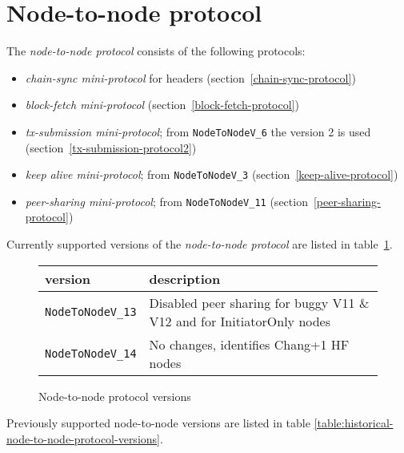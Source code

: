 \section{Node-to-node protocol}
\label{section:node-to-node-protocol}
\newline
{}\newline

The \textit{node-to-node protocol} consists of the following protocols:
\begin{itemize}
  \item \textit{chain-sync mini-protocol} for headers (section~\ref{chain-sync-protocol})
  \item \textit{block-fetch mini-protocol} (section~\ref{block-fetch-protocol})
  \item \textit{tx-submission mini-protocol};  from \texttt{NodeToNodeV\_6} the version
    2 is used  (section~\ref{tx-submission-protocol2})
  \item \textit{keep alive mini-protocol}; from \texttt{NodeToNodeV\_3} (section~\ref{keep-alive-protocol})
  \item \textit{peer-sharing mini-protocol}; from \texttt{NodeToNodeV\_11} (section~\ref{peer-sharing-protocol})
\end{itemize}
Currently supported versions of the \textit{node-to-node protocol} are listed
in table~\ref{table:node-to-node-protocol-versions}.
\begin{figure}[h]
  \begin{center}
    \begin{tabular}{l|l}
      version         & description \\\hline\hline
      \texttt{NodeToNodeV\_13} & Disabled peer sharing for buggy V11 \& V12 and for InitiatorOnly nodes \\\hline
      \texttt{NodeToNodeV\_14} & No changes, identifies Chang+1 HF nodes\\\hline
    \end{tabular}
    \caption{Node-to-node protocol versions}
    \label{table:node-to-node-protocol-versions}
  \end{center}
\end{figure}
\newline
Previously supported node-to-node versions are listed in table \ref{table:historical-node-to-node-protocol-versions}.

